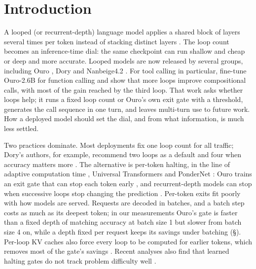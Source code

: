 \section{Introduction}
\label{sec:intro}

A looped (or recurrent-depth) language model applies a shared block of layers several times per
token instead of stacking distinct layers
\citep{dehghani2019universal,geiping2025recurrent,zhu2025ouro}. The loop count becomes an
inference-time dial: the same checkpoint can run shallow and cheap or deep and more accurate.
Looped models are now released by several groups, including Ouro \citep{zhu2025ouro}, Dory
\citep{nvidia2026dory} and Nanbeige4.2 \citep{nanbeige2026}. For tool calling in particular,
\citet{popescu2026toolcalling} fine-tune Ouro-2.6B for function calling and show that more loops
improve compositional calls, with most of the gain reached by the third loop. That work asks
whether loops help; it runs a fixed loop count or Ouro's own exit gate with a threshold,
generates the call sequence in one turn, and leaves multi-turn use to future work. How a deployed
model should set the dial, and from what information, is much less settled.

Two practices dominate. Most deployments fix one loop count for all traffic; Dory's authors, for
example, recommend two loops as a default and four when accuracy matters more
\citep{nvidia2026dory}. The alternative is per-token halting, in the line of adaptive computation
time \citep{graves2016adaptive}, Universal Transformers \citep{dehghani2019universal} and
PonderNet \citep{banino2021pondernet}: Ouro trains an exit gate that can stop each token early
\citep{zhu2025ouro}, and recurrent-depth models can stop when successive loops stop changing the
prediction \citep{geiping2025recurrent}. Per-token exits fit poorly with how models are served.
Requests are decoded in batches, and a batch step costs as much as its deepest token; in our
measurements Ouro's gate is faster than a fixed depth of matching accuracy at batch size 1 but
slower from batch size 4 on, while a depth fixed per request keeps its savings under batching (\S{}). Per-loop KV caches
also force every loop to be computed for earlier tokens, which removes most of the gate's
savings \citep{mishra2026dynamic}. Recent
analyses also find that learned halting gates do not track problem difficulty well
\citep{popescu2026halting,olszowiec2026monitoring}.

